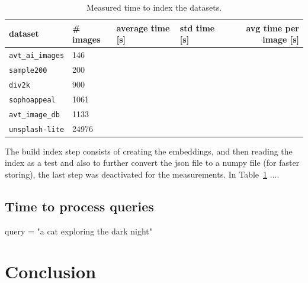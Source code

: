 \documentclass{article}
\begin{document}
\begin{table}[htb!]
\caption{Measured time to index the datasets.}
\label{tbl:measured_time_to_index_the_datasets_}
\begin{tabular}{llllr}
\toprule
dataset                  & \# images & average time [s]   & std time [s]       & avg time per image [s] \\
\midrule
\texttt{avt\_ai\_images} & 146       &                    &                    & \\
\texttt{sample200}       & 200       &                    &                    & \\
\texttt{div2k}           & 900       &                    &                    & \\
\texttt{sophoappeal}     & 1061      &                    &                    & \\
\texttt{avt\_image\_db}  & 1133      &                    &                    & \\
\texttt{unsplash-lite}   & 24976     &                    &                    & \\
\bottomrule
\end{tabular}
\end{table}

The build index step consists of creating the embeddings, and then reading the index as a test and also to further convert the json file to a numpy file (for faster storing), the last step was deactivated for the measurements.
In Table~\ref{tbl:measured_time_to_index_the_datasets_} ....

\subsection{Time to process queries}

query = "a cat exploring the dark night"

\section{Conclusion}




\end{document}
